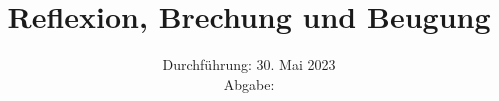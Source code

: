 

\subject{\texorpdfstring{\vspace{2ex}}{}V400\texorpdfstring{\vspace{-2ex}}{}} %
\title{Reflexion, Brechung und Beugung} %
\date{
	Durchführung: 30. Mai 2023 %
	\\ Abgabe:%
}




\maketitle
\thispagestyle{empty}


\tableofcontents
\newpage







\printbibliography{}

\newpage



